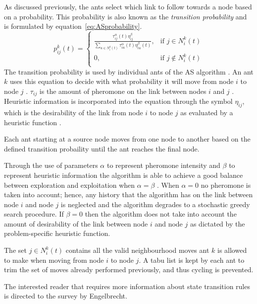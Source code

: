  As discussed previously, the ants select which link to follow towards a node based on a probability. This probability is also known as the \emph{transition probability} and is formulated by equation~\ref{eq:ASprobability}.
\begin{equation}
\label{eq:ASprobability}
p^k_{ij}(t) =
\begin{cases}
	\frac{\tau^{\alpha}_{ij}(t)\eta^{\beta}_{ij}}{\sum_{u \in N^k_i(t)} {\tau^{\alpha}_{iu}(t)\eta^{\beta}_{iu}(t)}}, &\text{if $j \in N^k_i(t)$}\\
	0, &\text{if $j \notin N^k_i(t)$}\\
\end{cases}
\end{equation}
The transition probability is used by individual ants of the \gls{AS} algorithm \cite{AntQAP,FundamentalSwarm}. An ant $k$ uses this equation to decide with what probability it will move from node $i$ to node $j$ \cite{CompuIntelligenceIntro,ACOLargeProblem}. $\tau_{ij}$ is the amount of pheromone on the link between nodes $i$ and $j$ \cite{AntsAndStigmergy,ACOLargeProblem}. Heuristic information is incorporated into the equation through the symbol $\eta_{ij}$, which is the desirability of the link from node $i$ to node $j$ as evaluated by a heuristic function \cite{AntsAndStigmergy,ACOLargeProblem}. 

Each ant starting at a source node moves from one node to another based on the defined transition probaility until the ant reaches the final node.

Through the use of parameters $\alpha$ to represent pheromone intensity and $\beta$ to represent heuristic information the algorithm is able to achieve a good balance between exploration and exploitation when $\alpha=\beta$ \cite{ACOLargeProblem,AntQAP}. When $\alpha = 0$ no pheromone is taken into account; hence, any history that the algorithm has on the link between node $i$ and node $j$ is neglected and the algorithm degrades to a stochastic greedy search procedure. If $\beta = 0$ then the algorithm does not take into account the amount of desirability of the link between node $i$ and node $j$ as dictated by the problem-specific heuristic function.

The set $j \in N^k_i(t)$ contains all the valid neighbourhood moves ant $k$ is allowed to make when moving from node $i$ to node $j$. A tabu list is kept by each ant to trim the set of moves already performed previously, and thus cycling is prevented.

The interested reader that requires more information about state transition rules is directed to the survey by Engelbrecht\cite{FundamentalSwarm}.
